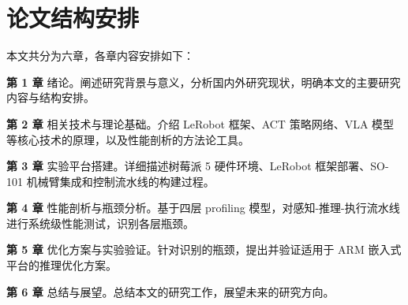 \section{论文结构安排}

本文共分为六章，各章内容安排如下：

\textbf{第 1 章} 绪论。阐述研究背景与意义，分析国内外研究现状，明确本文的主要研究内容与结构安排。

\textbf{第 2 章} 相关技术与理论基础。介绍 LeRobot 框架、ACT 策略网络、VLA 模型等核心技术的原理，以及性能剖析的方法论工具。

\textbf{第 3 章} 实验平台搭建。详细描述树莓派 5 硬件环境、LeRobot 框架部署、SO-101 机械臂集成和控制流水线的构建过程。

\textbf{第 4 章} 性能剖析与瓶颈分析。基于四层 profiling 模型，对感知-推理-执行流水线进行系统级性能测试，识别各层瓶颈。

\textbf{第 5 章} 优化方案与实验验证。针对识别的瓶颈，提出并验证适用于 ARM 嵌入式平台的推理优化方案。

\textbf{第 6 章} 总结与展望。总结本文的研究工作，展望未来的研究方向。

\endinput
